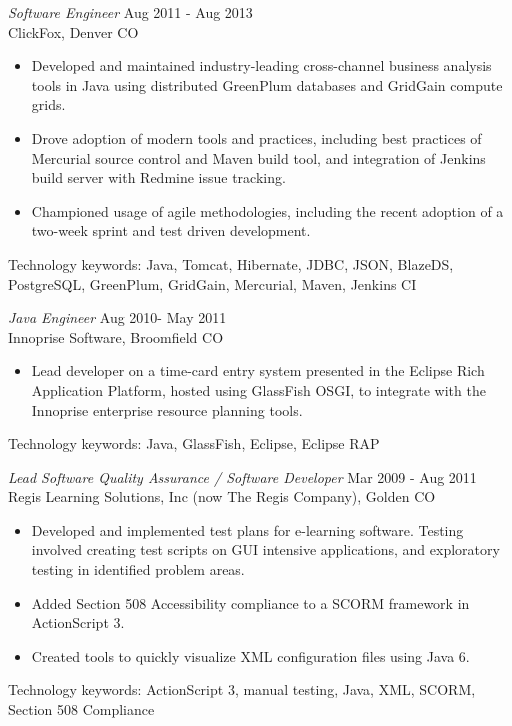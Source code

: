 \documentclass[line,margin]{res}
\begin{document}
\begin{resume}
 {\sl Software Engineer} \hfill               Aug 2011 - Aug 2013 \\
	      ClickFox, Denver CO
                 \begin{itemize} %
                 \item Developed and maintained industry-leading cross-channel business analysis tools in Java using distributed GreenPlum databases and GridGain compute grids.
                \item Drove adoption of modern tools and practices, including best practices of Mercurial source control and Maven build tool, 
                and integration of Jenkins build server with Redmine issue tracking.
   	    \item  Championed usage of agile methodologies, including the recent adoption of a two-week sprint and test driven development.
\end{itemize}
	Technology keywords: Java, Tomcat, Hibernate, JDBC, JSON, BlazeDS, PostgreSQL, GreenPlum, GridGain, Mercurial, Maven, Jenkins CI
 
{\sl Java Engineer} \hfill          Aug 2010- May 2011 \\
                Innoprise Software, Broomfield CO
                 \begin{itemize} %
                 \item Lead developer on a time-card entry system presented in the Eclipse Rich Application Platform, hosted using GlassFish OSGI, to integrate with the
		Innoprise enterprise resource planning tools.
\end{itemize} 
	     Technology keywords: Java, GlassFish, Eclipse, Eclipse RAP
                

                {\sl Lead Software Quality Assurance / Software Developer} \hfill        Mar 2009 - Aug 2011 \\
                Regis Learning Solutions, Inc (now The Regis Company), Golden CO
                  \begin{itemize} %
                   \item Developed and implemented test plans for e-learning software. Testing involved creating test scripts on GUI intensive applications, and exploratory testing in identified problem areas.
		\item Added Section 508 Accessibility compliance to a SCORM framework in ActionScript 3.
		\item Created tools to quickly visualize XML configuration files using Java 6.   
    \end{itemize} 
		Technology keywords: ActionScript 3, manual testing, Java, XML, SCORM, Section 508 Compliance
            

\end{resume}
\end{document}
